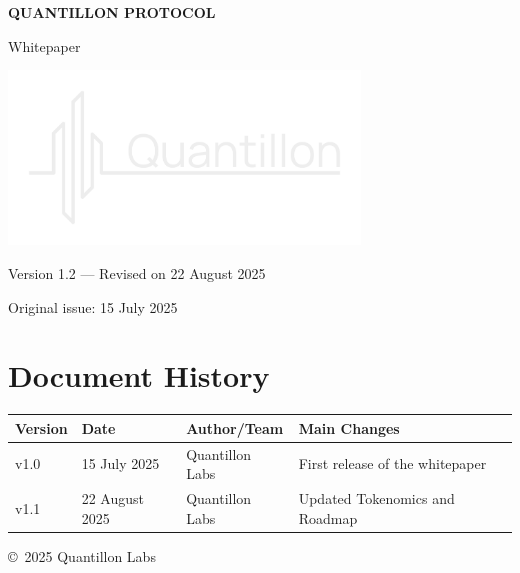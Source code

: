 \documentclass[12pt,a4paper]{report}
\begin{document}
\begin{titlepage}
  \centering
  {\huge\bfseries QUANTILLON PROTOCOL\par}
  \vspace{1em}
  {\Large Whitepaper\par}
  \vspace*{\fill}
  \includegraphics[width=0.7\textwidth]{media/image1.png}\par
  \vspace*{\fill}
  {\large Version 1.2 — Revised on 22 August 2025\par}
  {\large Original issue: 15 July 2025\par}
\end{titlepage}

\section*{Document History}
\begin{tabularx}{\textwidth}{@{} l l l X @{} }
\toprule
\textbf{Version} & \textbf{Date} & \textbf{Author/Team} & \textbf{Main Changes} \\
\midrule
v1.0 & 15 July 2025 & Quantillon Labs & First release of the whitepaper \\
v1.1 & 22 August 2025 & Quantillon Labs & Updated Tokenomics and Roadmap \\
\bottomrule
\end{tabularx}
\newpage

\tableofcontents
\newpage



\vfill
\begin{center}
  \small \copyright~2025 Quantillon Labs
\end{center}
\end{document}
